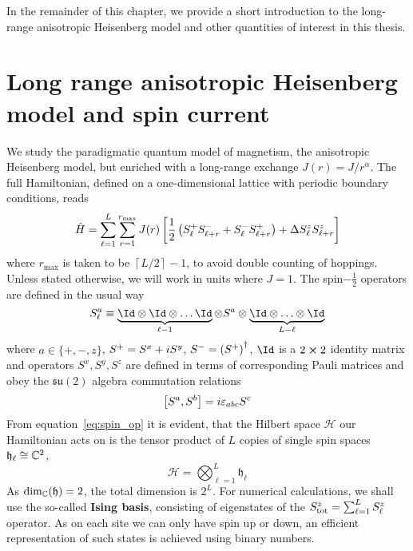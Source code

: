 In the remainder of this chapter, we provide a short introduction to the long-range anisotropic Heisenberg model
and other quantities of interest in this thesis.

\section{Long range anisotropic Heisenberg model and spin current}

We study the paradigmatic quantum model of magnetism, the anisotropic Heisenberg
model, but enriched with a long-range exchange \(J(r) = J/r^{\alpha}\). The full Hamiltonian,
defined on a one-dimensional lattice with periodic boundary conditions, reads
\begin{equation}
    \hat{H}  = \sum_{\ell=1}^{L}\sum_{r=1}^{r_{\mathrm{max}}} J(r) \left[\frac{1}{2} \left(
        S^{+}_{\ell}S^{-}_{\ell+r} + S^{-}_{\ell}S^{+}_{\ell+r}\right) + \Delta S^{z}_{\ell}S^{z}_{\ell+r}
        \right]
    \label{eq:long_range}
\end{equation}
where \(r_{\mathrm{max}}\) is taken to be \(\left\lceil L/2\right\rceil - 1 \), to avoid double counting of hoppings.
Unless stated otherwise, we will work in units where \(J = 1\).
The spin\(-\frac{1}{2}\) operators are defined in the usual way
\begin{equation}
    S_{\ell}^{a} \equiv  \underbrace{\Id \otimes \Id \otimes \ldots \Id}_{\ell-1} \otimes S^{a} \otimes \underbrace{\Id \otimes \ldots \otimes \Id}_{L-\ell}
    \label{eq:spin_op}
\end{equation}
where \(a\in\{+,-,z\}\), \(S^{+} = S^x + i S^y\), \(S^{-} = \left(S^{+}\right)^{\dagger}\),
\(\Id\) is a \(2\cross 2\) identity matrix and operators \(S^x,S^y,S^z\) are defined in terms
of corresponding Pauli matrices and obey the \(\mathfrak{su}(2)\) algebra commutation relations
\begin{equation}
    \comm{S^a}{S^b} = i \varepsilon_{abc} S^c
\end{equation}
From equation~\eqref{eq:spin_op} it is evident, that the Hilbert space \(\mathcal{H}\) our Hamiltonian acts on
is the tensor product of \(L\) copies of single spin spaces \(\mathfrak{h}_{\ell} \cong \mathbb{C}^2\),
\begin{equation}
    \mathcal{H} = \bigotimes_{\ell=1}^{L} \mathfrak{h}_{\ell}
\end{equation}
As \(\mathrm{dim_{\mathbb{C}}}(\mathfrak{h}) = 2\), the total dimension is \(2^L\).
For numerical calculations, we shall use the so-called \textbf{Ising basis}, consisting of eigenstates
of the \(S^z_{\mathrm{tot}} = \sum_{\ell=1}^{L} S^{z}_{\ell}\) operator. As on each site we can only
have spin up or down, an efficient representation of such states is achieved using binary numbers.

